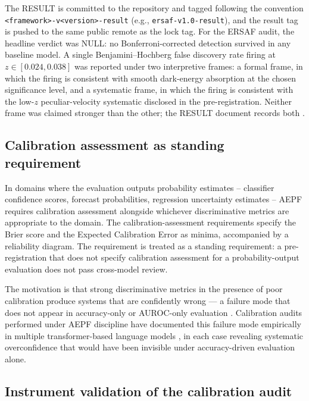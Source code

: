 \documentclass[11pt]{article}
\begin{document}
The RESULT is committed to the repository and tagged following the
convention \texttt{<framework>-v<version>-result}
(e.g., \texttt{ersaf-v1.0-result}), and the result tag is pushed to
the same public remote as the lock tag. For the ERSAF audit, the
headline verdict was NULL: no Bonferroni-corrected detection survived
in any baseline model. A single Benjamini--Hochberg false discovery
rate firing at $z \in [0.024, 0.038]$ was reported under two
interpretive frames: a formal frame, in which the firing is
consistent with smooth dark-energy absorption at the chosen
significance level, and a systematic frame, in which the firing is
consistent with the low-$z$ peculiar-velocity systematic disclosed
in the pre-registration. Neither frame was claimed stronger than the
other; the RESULT document records both \cite{dixon2026ersaf}.

\subsection{Calibration assessment as standing requirement}
\label{subsec:calibration-req}

In domains where the evaluation outputs probability estimates --
classifier confidence scores, forecast probabilities, regression
uncertainty estimates -- AEPF requires calibration assessment
alongside whichever discriminative metrics are appropriate to the
domain. The calibration-assessment requirements specify the Brier
score \cite{brier1950} and the Expected Calibration Error
\cite{naeini2015ece, guo2017calibration} as minima, accompanied by a
reliability diagram. The requirement is treated as a standing
requirement: a pre-registration that does not specify calibration
assessment for a probability-output evaluation does not pass
cross-model review.

The motivation is that strong discriminative metrics in the presence
of poor calibration produce systems that are confidently wrong --- a
failure mode that does not appear in accuracy-only or AUROC-only
evaluation \cite{guo2017calibration, minderer2021revisiting}.
Calibration audits performed under AEPF discipline have documented
this failure mode empirically in multiple transformer-based language
models \cite{dixon2026distilbert, dixon2026toxicbert,
dixon2026chatgptdetector}, in each case revealing systematic
overconfidence that would have been invisible under accuracy-driven
evaluation alone.

\subsection{Instrument validation of the calibration audit}
\label{subsec:instrument-validation}
\end{document}
